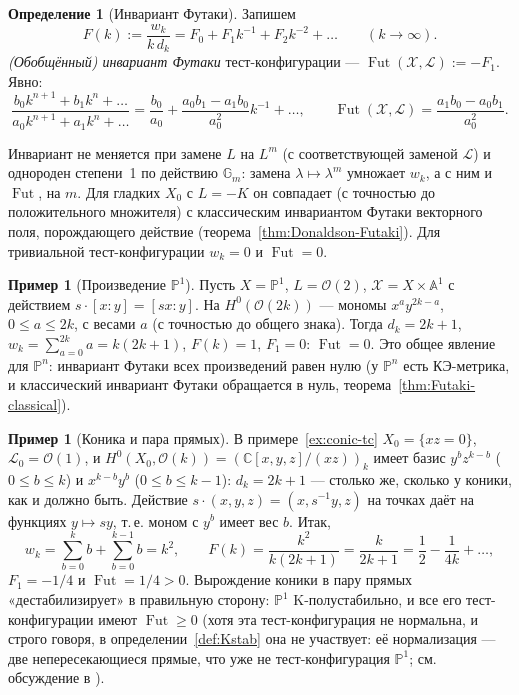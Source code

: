 \documentclass[11pt,a4paper]{article}
\theoremstyle{plain}
\theoremstyle{definition}
\newtheorem{definition}[theorem]{Определение}
\newtheorem{example}[theorem]{Пример}
\theoremstyle{remark}
\renewcommand{\C}{\mathbb{C}}
\newcommand{\PP}{\mathbb{P}}
\newcommand{\A}{\mathbb{A}}
\newcommand{\Gm}{\mathbb{G}_m}
\newcommand{\cO}{\mathcal{O}}
\newcommand{\cL}{\mathcal{L}}
\newcommand{\cX}{\mathcal{X}}
\DeclareMathOperator{\Fut}{Fut}
\begin{document}
\begin{definition}[Инвариант Футаки]\label{def:Futaki}
Запишем
\[
F(k):=\frac{w_k}{k\,d_k}=F_0+F_1k^{-1}+F_2k^{-2}+\dots\qquad(k\to\infty).
\]
\emph{(Обобщённый) инвариант Футаки} тест-конфигурации --- $\Fut(\cX,\cL):=-F_1$. Явно:
\[
\frac{b_0k^{n+1}+b_1k^n+\dots}{a_0k^{n+1}+a_1k^n+\dots}=\frac{b_0}{a_0}+\frac{a_0b_1-a_1b_0}{a_0^2}k^{-1}+\dots,
\qquad\Fut(\cX,\cL)=\frac{a_1b_0-a_0b_1}{a_0^2}.
\]
\end{definition}

Инвариант не меняется при замене $L$ на $L^m$ (с соответствующей заменой $\cL$) и однороден
степени~1 по действию $\Gm$: замена $\lambda\mapsto\lambda^m$ умножает $w_k$, а с ним и $\Fut$,
на $m$. Для гладких
$X_0$ с $L=-K$ он совпадает (с точностью до положительного множителя) с классическим инвариантом
Футаки векторного поля, порождающего действие (теорема~\ref{thm:Donaldson-Futaki}). Для тривиальной
тест-конфигурации $w_k=0$ и $\Fut=0$.

\begin{example}[Произведение $\PP^1$]\label{ex:product-P1}
Пусть $X=\PP^1$, $L=\cO(2)$, $\cX=X\times\A^1$ с действием $s\cdot[x:y]=[sx:y]$. На
$H^0(\cO(2k))$ --- мономы $x^ay^{2k-a}$, $0\le a\le2k$, с весами $a$ (с точностью до общего знака).
Тогда $d_k=2k+1$, $w_k=\sum_{a=0}^{2k}a=k(2k+1)$, $F(k)=1$, $F_1=0$: $\Fut=0$. Это общее явление
для $\PP^n$: инвариант Футаки всех произведений равен нулю (у $\PP^n$ есть КЭ-метрика, и классический
инвариант Футаки обращается в нуль, теорема~\ref{thm:Futaki-classical}).
\end{example}

\begin{example}[Коника и пара прямых]\label{ex:conic-Futaki}
В примере~\ref{ex:conic-tc} $X_0=\{xz=0\}$, $\cL_0=\cO(1)$, и
$H^0(X_0,\cO(k))=(\C[x,y,z]/(xz))_k$ имеет базис $y^bz^{k-b}$ ($0\le b\le k$) и $x^{k-b}y^b$
($0\le b\le k-1$): $d_k=2k+1$ --- столько же, сколько у коники, как и должно быть. Действие
$s\cdot(x,y,z)=(x,s^{-1}y,z)$ на точках даёт на функциях $y\mapsto sy$, т.\,е. моном с $y^b$ имеет
вес $b$. Итак,
\[
w_k=\sum_{b=0}^kb+\sum_{b=0}^{k-1}b=k^2,\qquad F(k)=\frac{k^2}{k(2k+1)}=\frac k{2k+1}=\frac12-\frac1{4k}+\dots,
\]
$F_1=-1/4$ и $\Fut=1/4>0$. Вырождение коники в пару прямых «дестабилизирует» в правильную сторону:
$\PP^1$ K-полустабильно, и все его тест-конфигурации имеют $\Fut\ge0$ (хотя эта тест-конфигурация
не нормальна, и строго говоря, в определении~\ref{def:Kstab} она не участвует: её нормализация ---
две непересекающиеся прямые, что уже не тест-конфигурация $\PP^1$; см. обсуждение в \cite[2.1]{Xu}).
\end{example}
\end{document}
